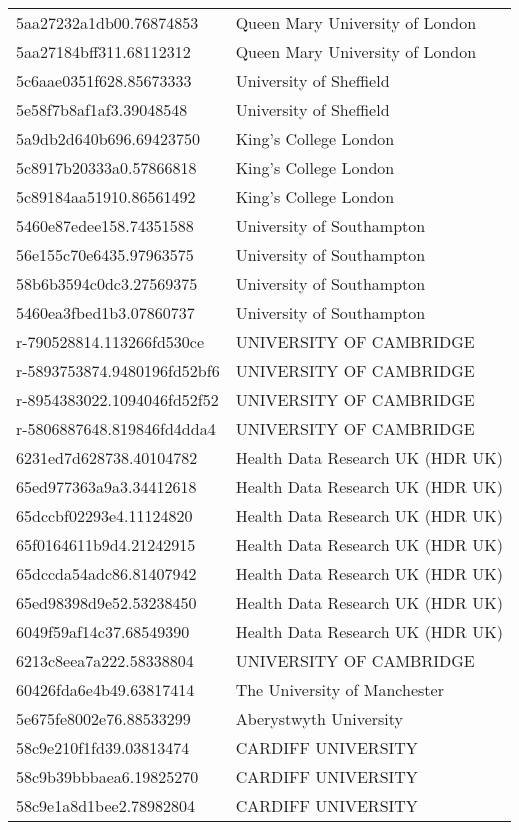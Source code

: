 \begin{tabular}{ll}
5aa27232a1db00.76874853 & Queen Mary University of London \\
5aa27184bff311.68112312 & Queen Mary University of London \\
5c6aae0351f628.85673333 & University of Sheffield \\
5e58f7b8af1af3.39048548 & University of Sheffield \\
5a9db2d640b696.69423750 & King's College London \\
5c8917b20333a0.57866818 & King's College London \\
5c89184aa51910.86561492 & King's College London \\
5460e87edee158.74351588 & University of Southampton \\
56e155c70e6435.97963575 & University of Southampton \\
58b6b3594c0dc3.27569375 & University of Southampton \\
5460ea3fbed1b3.07860737 & University of Southampton \\
r-790528814.113266fd530ce & UNIVERSITY OF CAMBRIDGE \\
r-5893753874.9480196fd52bf6 & UNIVERSITY OF CAMBRIDGE \\
r-8954383022.1094046fd52f52 & UNIVERSITY OF CAMBRIDGE \\
r-5806887648.819846fd4dda4 & UNIVERSITY OF CAMBRIDGE \\
6231ed7d628738.40104782 & Health Data Research UK (HDR UK) \\
65ed977363a9a3.34412618 & Health Data Research UK (HDR UK) \\
65dccbf02293e4.11124820 & Health Data Research UK (HDR UK) \\
65f0164611b9d4.21242915 & Health Data Research UK (HDR UK) \\
65dccda54adc86.81407942 & Health Data Research UK (HDR UK) \\
65ed98398d9e52.53238450 & Health Data Research UK (HDR UK) \\
6049f59af14c37.68549390 & Health Data Research UK (HDR UK) \\
6213c8eea7a222.58338804 & UNIVERSITY OF CAMBRIDGE \\
60426fda6e4b49.63817414 & The University of Manchester \\
5e675fe8002e76.88533299 & Aberystwyth University \\
58c9e210f1fd39.03813474 & CARDIFF UNIVERSITY \\
58c9b39bbbaea6.19825270 & CARDIFF UNIVERSITY \\
58c9e1a8d1bee2.78982804 & CARDIFF UNIVERSITY \\

\end{tabular}
